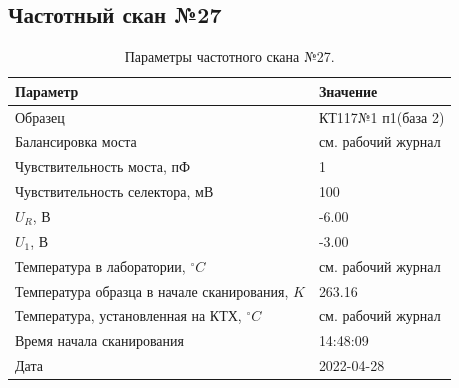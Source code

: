 \subsection{Частотный скан №27}
\begin{table}[!ht]
    \centering
    \caption{Параметры частотного скана №27.}
    \begin{tabular}{|l|l|}
        \hline
        Параметр                                       & Значение                  \\ \hline
        Образец                                        & КТ117№1 п1(база 2)        \\ \hline
        Балансировка моста                             & см. рабочий журнал        \\ \hline
        Чувствительность моста, пФ                     & 1                         \\ \hline
        Чувствительность селектора, мВ                 & 100                       \\ \hline
        $U_R$, В                                       & -6.00                     \\ \hline
        $U_1$, В                                       & -3.00                     \\ \hline
        Температура в лаборатории, $^\circ C$          & см. рабочий журнал        \\ \hline
        Температура образца в начале сканирования, $K$ & 263.16                    \\ \hline
        Температура, установленная на КТХ, $^\circ C$  & см. рабочий журнал        \\ \hline
        Время начала сканирования                      & 14:48:09                  \\ \hline
        Дата                                           & 2022-04-28                \\ \hline
    \end{tabular}
    \label{table:frequency_scan_27}
\end{table}

